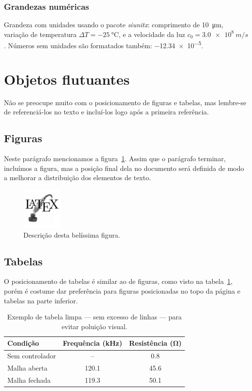 \documentclass[a4paper,11pt]{article}
\begin{document}
\subsubsection{Grandezas numéricas}

Grandeza com unidades usando o pacote \emph{siunitx}: comprimento de \SI{10}{\micro m}, variação de temperatura $\Delta T = \SI{-25}{\celsius}$, e a velocidade da luz $c_0 = \SI{3.0e8}{m/s}$.
Números sem unidades são formatados também: \num{-12.34e-5}.


\section{Objetos flutuantes}

Não se preocupe muito com o posicionamento de figuras e tabelas, mas lembre-se de referenciá-los no texto e incluí-los logo após a primeira referência.


\subsection{Figuras}

Neste parágrafo mencionamos a figura~\ref{fig:exemplo}.
Assim que o parágrafo terminar, incluímos a figura, mas a posição final dela no documento será definida de modo a melhorar a distribuição dos elementos de texto.

\begin{figure}[htpb]
\centering
\includegraphics[width=2cm]{exemplo}
\caption{Descrição desta belíssima figura.}
\label{fig:exemplo}
\end{figure}


\subsection{Tabelas}

O posicionamento de tabelas é similar ao de figuras, como visto na tabela~\ref{tab:exemplo}, porém é costume dar preferência para figuras posicionadas no topo da página e tabelas na parte inferior.

\begin{table}[hbpt]
\centering
\caption{Exemplo de tabela limpa --- sem excesso de linhas --- para evitar poluição visual.}
\label{tab:exemplo}
\begin{tabular}{lcc}
\toprule
Condição & Frequência (\si{kHz}) & Resistência (\si{\ohm}) \\
\midrule
Sem controlador & -- & \num{0.8} \\
Malha aberta & \num{120.1} & \num{45.6} \\
Malha fechada & \num{119.3} & \num{50.1} \\
\bottomrule
\end{tabular}
\end{table}




\end{document}
